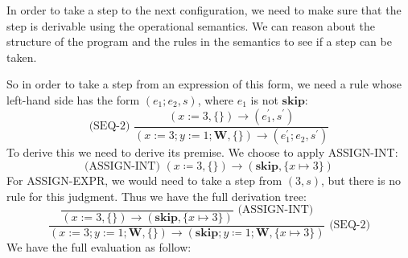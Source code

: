 In order to take a step to the next configuration, we need to make sure that the step is derivable using the operational semantics. We can reason about the structure of the program and the rules in the semantics to see if a step can be taken. 

So in order to take a step from an expression of this form, we need a rule whose left-hand side has the form \((e_1; e_2, s)\), where \(e_1\) is not \(\mathbf{skip}\):
\[
  \text{(SEQ-2) } \dfrac{(x := 3, \{\}) \to (e_1^{\prime}, s^{\prime})}{(x := 3; y := 1; \mathbf{W}, \{\}) \to (e_1^{\prime}; e_2, s^{\prime})}
\]
To derive this we need to derive its premise. We choose to apply ASSIGN-INT:
\[
  \text{(ASSIGN-INT) } (x \coloneqq 3, \{\}) \to (\mathbf{skip}, \{x \mapsto 3\})
\]
For ASSIGN-EXPR, we would need to take a step from \((3, s)\), but there is no rule for this judgment. Thus we have the full derivation tree:
\[
  \dfrac{\dfrac{}{(x := 3, \{\}) \to (\mathbf{skip}, \{x \mapsto 3\})} \text{ (ASSIGN-INT)}}{(x := 3; y := 1; \mathbf{W}, \{\}) \to (\mathbf{skip}; y \coloneqq 1; \mathbf{W}, \{x \mapsto 3\})} \text{ (SEQ-2)} 
\]
We have the full evaluation as follow:
